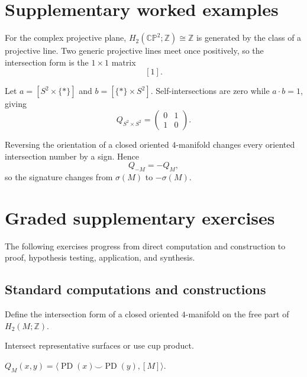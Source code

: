 \section{Supplementary worked examples}
\label{sec:viii34-pedagogy}

\begin{example}\label{ex:viii34-ped-01}
For the complex projective plane, $H_2(\mathbb{CP}^2;\mathbb Z)\cong\mathbb Z$ is generated by the class of a projective line. Two generic projective lines meet once positively, so the intersection form is the $1\times1$ matrix
\[
[1].
\]
\end{example}

\begin{example}\label{ex:viii34-ped-02}
Let $a=[S^2\times\{*\}]$ and $b=[\{*\}\times S^2]$. Self-intersections are zero while $a\cdot b=1$, giving
\[
Q_{S^2\times S^2}=
\begin{pmatrix}
0&1\\
1&0
\end{pmatrix}.
\]
\end{example}

\begin{example}\label{ex:viii34-ped-03}
Reversing the orientation of a closed oriented $4$-manifold changes every oriented intersection number by a sign. Hence
\[
Q_{-M}=-Q_M,
\]
so the signature changes from $\sigma(M)$ to $-\sigma(M)$.
\end{example}

\section{Graded supplementary exercises}
The following exercises progress from direct computation and construction to proof, hypothesis testing, application, and synthesis.

\subsection*{Standard computations and constructions}

\begin{exercise}\label{exr:viii34-ped-01}
Define the intersection form of a closed oriented $4$-manifold on the free part of $H_2(M;\mathbb Z)$.
\end{exercise}
\begin{hint}
Intersect representative surfaces or use cup product.
\end{hint}
\begin{solution}
$Q_M(x,y)=\langle \operatorname{PD}(x)\smile\operatorname{PD}(y),[M]\rangle$.
\end{solution}

